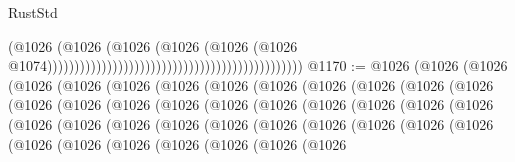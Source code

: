 \begin{lexlean}{RustStd}
\begin{coremodule}
                                                                                      (@1026
                                                                                        (@1026
                                                                                          (@1026
                                                                                            (@1026
                                                                                              (@1026
                                                                                                (@1026
                                                                                                  @1074)))))))))))))))))))))))))))))))))))))))))))))))
@1170 := @1026
    (@1026
      (@1026
        (@1026
          (@1026
            (@1026
              (@1026
                (@1026
                  (@1026
                    (@1026
                      (@1026
                        (@1026
                          (@1026
                            (@1026
                              (@1026
                                (@1026
                                  (@1026
                                    (@1026
                                      (@1026
                                        (@1026
                                          (@1026
                                            (@1026
                                              (@1026
                                                (@1026
                                                  (@1026
                                                    (@1026
                                                      (@1026
                                                        (@1026
                                                          (@1026
                                                            (@1026
                                                              (@1026
                                                                (@1026
                                                                  (@1026
                                                                    (@1026
                                                                      (@1026
                                                                        (@1026
                                                                          (@1026
                                                                            (@1026
                                                                              (@1026
                                                                                (@1026

\end{coremodule}
\end{lexlean}
